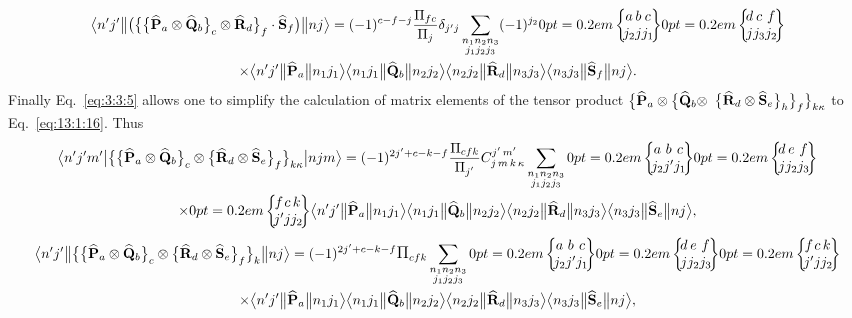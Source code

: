 \begin{multline*}
\braOketred{ n^{\prime} j^{\prime}}{\bigl(\bigl\{\bigl\{\widehat{\vect{P}}_{a} \otimes \widehat{\vect{Q}}_{b}\bigr\}_{c} \otimes \widehat{\vect{R}}_{d}\bigr\}_{f} \cdot \widehat{\vect{S}}_{f}\bigr)}{n j}=(-1)^{c-f-j} \frac{\Fact{f c}}{\Fact{j}} \delta_{j^{\prime} j}
\sum_{\substack{n_{1} n_{2} n_{3} \\ j_{1} j_{2} j_{3}}}(-1)^{j_{2}}
\sixj{a}{b}{c}{j_{2}}{j}{j_{1}}
\sixj{d}{c}{f}{j}{j_{3}}{j_{2}} \\
\times
\braOketred{ n^{\prime} j^{\prime}}{\widehat{\vect{P}}_{a}}{ n_{1} j_{1}}
\braOketred{ n_{1} j_{1}}{\widehat{\vect{Q}}_{b}}{ n_{2} j_{2}}
\braOketred{ n_{2} j_{2}}{\widehat{\vect{R}}_{d}}{ n_{3} j_{3}}
\braOketred{ n_{3} j_{3}}{\widehat{\vect{S}}_{f}}{ n j}.
\end{multline*}
Finally Eq.~\eqref{eq:3:3:5} allows one to simplify the calculation of matrix elements of the tensor product \(\bigl\{\widehat{\mathbf{P}}_{a} \otimes\bigl\{\widehat{\mathbf{Q}}_{b} \otimes\) \(\bigl\{\widehat{\mathbf{R}}_{d} \otimes \widehat{\mathbf{S}}_{e}\bigr\}_{h}\bigr\}_{f}\bigr\}_{k \kappa}\) to Eq.~\eqref{eq:13:1:16}. Thus
\begin{gather}
\braOket{ n^{\prime} j^{\prime} m^{\prime}}{\bigl\{\bigl\{\widehat{\vect{P}}_{a} \otimes \widehat{\vect{Q}}_{b}\bigr\}_{c} \otimes\bigl\{\widehat{\vect{R}}_{d} \otimes \widehat{\vect{S}}_{e}\bigr\}_{f}\bigr\}_{k \kappa}}{n j m}=(-1)^{2 j^{\prime}+c-k-f} \frac{\Fact{c f k}}{\Fact{j^{\prime}}} 
\clebsch{j}{m}{k}{\kappa}{j^{\prime}}{m^{\prime}} \sum_{\substack{n_{1} n_{2} n_{3} \notag\\
j_{1} j_{2} j_{3}}}
\sixj{a}{b}{c}{j_{2}}{j^{\prime}}{j_{1}}
\sixj{d}{e}{f}{j}{j_{2}}{j_{3}} \\
\times
\sixj{f}{c}{k}{j^{\prime}}{j}{j_{2}}
\braOketred{ n^{\prime} j^{\prime}}{\widehat{\vect{P}}_{a}}{ n_{1} j_{1}}
\braOketred{ n_{1} j_{1}}{\widehat{\vect{Q}}_{b}}{ n_{2} j_{2}}
\braOketred{ n_{2} j_{2}}{\widehat{\vect{R}}_{d}}{ n_{3} j_{3}}
\braOketred{ n_{3} j_{3}}{\widehat{\vect{S}}_{e}}{ n j},  \label{eq:13:1:18}
\end{gather}
\begin{multline*}
\braOketred{ n^{\prime} j^{\prime}}{\bigl\{\bigl\{\widehat{\vect{P}}_{a} \otimes \widehat{\vect{Q}}_{b}\bigr\}_{c} \otimes\bigl\{\widehat{\vect{R}}_{d} \otimes \widehat{\vect{S}}_{e}\bigr\}_{f}\bigr\}_{k}}{n j}=(-1)^{2 j^{\prime}+c-k-f} \Fact{c f k}
\sum_{\substack{n_{1} n_{2} n_{3} \\ j_{1} j_{2} j_{3}}}
\sixj{a}{b}{c}{j_{2}}{j^{\prime}}{j_{1}}
\sixj{d}{e}{f}{j}{j_{2}}{j_{3}}
\sixj{f}{c}{k}{j^{\prime}}{j}{j_{2}} \\
\times
\braOketred{ n^{\prime} j^{\prime}}{\widehat{\vect{P}}_{a}}{ n_{1} j_{1}}
\braOketred{ n_{1} j_{1}}{\widehat{\vect{Q}}_{b}}{ n_{2} j_{2}}
\braOketred{ n_{2} j_{2}}{\widehat{\vect{R}}_{d}}{ n_{3} j_{3}}
\braOketred{ n_{3} j_{3}}{\widehat{\vect{S}}_{e}}{ n j},
\end{multline*}

